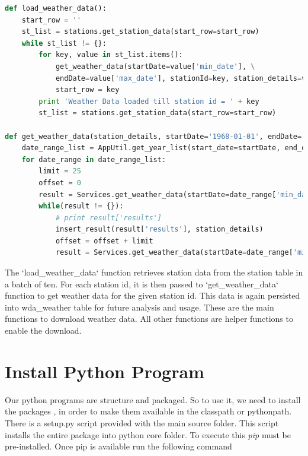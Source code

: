 \documentclass[9pt,twocolumn,twoside]{../../styles/osajnl}
\begin{document}
\begin{itemize}
 \begin{lstlisting}[language=Python,caption=Get Weather Stations,breaklines=true]
def load_weather_data():
    start_row = ''
    st_list = stations.get_station_data(start_row=start_row)
    while st_list != {}:
        for key, value in st_list.items():
            get_weather_data(startDate=value['min_date'], \
            endDate=value['max_date'], stationId=key, station_details=value) 
            start_row = key
        print 'Weather Data loaded till station id = ' + key
        st_list = stations.get_station_data(start_row=start_row)    

def get_weather_data(station_details, startDate='1968-01-01', endDate='1970-01-01', stationId='GHCND:IN001011001'):
    date_range_list = AppUtil.get_year_list(start_date=startDate, end_date=endDate)
    for date_range in date_range_list:
        limit = 25    
        offset = 0
        result = Services.get_weather_data(startDate=date_range['min_date'],\ endDate=date_range['max_date'], stationId=stationId, offset=offset)   
        while(result != {}):        
            # print result['results']
            insert_result(result['results'], station_details)
            offset = offset + limit
            result = Services.get_weather_data(startDate=date_range['min_date'],\ endDate=date_range['max_date'], stationId=stationId, offset=offset)

\end{lstlisting}

The `load\_weather\_data` function retrieves station data from the station table in a batch of ten. For each station id, it is then passed to `get\_weather\_data` function to get weather data for the given station id. This data is again persisted into wda\_weather table for future analysis and usage. These are the main functions to download weather data. All other functions are helper functions to enable the download. 

\end{itemize}


\section{Install Python Program}
Our python programs are structure and packaged. So to use it, we need to install the packages , in order to make them available in the classpath or pythonpath. There is a setup.py script provided with the main source folder. This script installs the entire package into python core folder. To execute this \textit{pip} must be pre-installed. Once pip is available run the following command 
\end{document}
